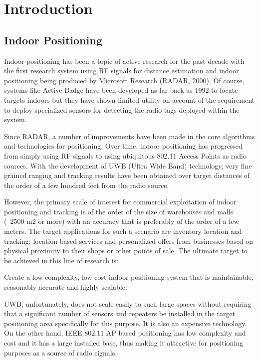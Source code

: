\chapter{Introduction}

\section{Indoor Positioning}

Indoor positioning has been a topic of active research for the past decade with the first research system using RF signals for distance estimation and indoor positioning being produced by Microsoft Research (RADAR, 2000). Of course, systems like Active Badge  have been developed as far back as 1992 to locate targets indoors but they have shown limited utility on account of the requirement to deploy specialized sensors for detecting the radio tags deployed within the system.

Since RADAR, a number of improvements have been made in the core algorithms and technologies for positioning. Over time, indoor positioning has progressed from simply using RF signals to using ubiquitous 802.11 Access Points as radio sources. With the development of UWB (Ultra Wide Band) technology, very fine grained ranging and tracking results have been obtained over target distances of the order of a few hundred feet from the radio source. 

However, the primary scale of interest for commercial exploitation of indoor positioning and tracking is of the order of the size of warehouses and malls (~2500 m2 or more) with an accuracy that is preferably of the order of a few meters. The target applications for such a scenario are inventory location and tracking; location based services and personalized offers from businesses based on physical proximity to their shops or other points of sale. The ultimate target to be achieved in this line of research is:

Create a low complexity, low cost indoor positioning system that is maintainable, reasonably accurate and highly scalable.

UWB, unfortunately, does not scale easily to such large spaces without requiring that a significant number of sensors and repeaters be installed in the target positioning area specifically for this purpose. It is also an expensive technology. On the other hand, IEEE 802.11 AP based positioning has low complexity and cost and it has a large installed base, thus making it attractive for positioning purposes as a source of radio signals.

